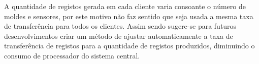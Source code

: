 \documentclass[11pt,twoside,a4paper]{report}
\begin{document}
A quantidade de registos gerada em cada cliente varia consoante o número de moldes e sensores, por este motivo não faz sentido que seja usada a mesma taxa de transferência para todos os clientes. Assim sendo sugere-se para futuros desenvolvimentos criar um método de ajustar automaticamente a taxa de transferência de registos para a quantidade de registos produzidos, diminuindo o consumo de processador do sistema central.
\end{document}
